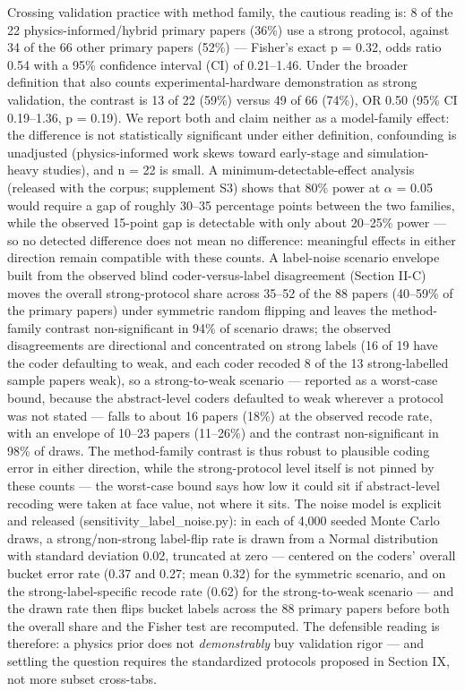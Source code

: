 \documentclass[journal]{IEEEtran}
\begin{document}
Crossing validation practice with method family, the cautious reading is: 8 of the 22 physics-informed/hybrid primary papers (36\%) use a strong protocol, against 34 of the 66 other primary papers (52\%) --- Fisher's exact p = 0.32, odds ratio 0.54 with a 95\% confidence interval (CI) of 0.21--1.46. Under the broader definition that also counts experimental-hardware demonstration as strong validation, the contrast is 13 of 22 (59\%) versus 49 of 66 (74\%), OR 0.50 (95\% CI 0.19--1.36, p = 0.19). We report both and claim neither as a model-family effect: the difference is not statistically significant under either definition, confounding is unadjusted (physics-informed work skews toward early-stage and simulation-heavy studies), and n = 22 is small. A minimum-detectable-effect analysis (released with the corpus; supplement S3) shows that 80\% power at $\alpha$ = 0.05 would require a gap of roughly 30--35 percentage points between the two families, while the observed 15-point gap is detectable with only about 20--25\% power --- so no detected difference does not mean no difference: meaningful effects in either direction remain compatible with these counts. A label-noise scenario envelope built from the observed blind coder-versus-label disagreement (Section II-C) moves the overall strong-protocol share across 35--52 of the 88 papers (40--59\% of the primary papers) under symmetric random flipping and leaves the method-family contrast non-significant in 94\% of scenario draws; the observed disagreements are directional and concentrated on strong labels (16 of 19 have the coder defaulting to weak, and each coder recoded 8 of the 13 strong-labelled sample papers weak), so a strong-to-weak scenario --- reported as a worst-case bound, because the abstract-level coders defaulted to weak wherever a protocol was not stated --- falls to about 16 papers (18\%) at the observed recode rate, with an envelope of 10--23 papers (11--26\%) and the contrast non-significant in 98\% of draws. The method-family contrast is thus robust to plausible coding error in either direction, while the strong-protocol level itself is not pinned by these counts --- the worst-case bound says how low it could sit if abstract-level recoding were taken at face value, not where it sits. The noise model is explicit and released (sensitivity\_label\_noise.py): in each of 4,000 seeded Monte Carlo draws, a strong/non-strong label-flip rate is drawn from a Normal distribution with standard deviation 0.02, truncated at zero --- centered on the coders' overall bucket error rate (0.37 and 0.27; mean 0.32) for the symmetric scenario, and on the strong-label-specific recode rate (0.62) for the strong-to-weak scenario --- and the drawn rate then flips bucket labels across the 88 primary papers before both the overall share and the Fisher test are recomputed. The defensible reading is therefore: a physics prior does not \textit{demonstrably} buy validation rigor --- and settling the question requires the standardized protocols proposed in Section IX, not more subset cross-tabs.
\end{document}
